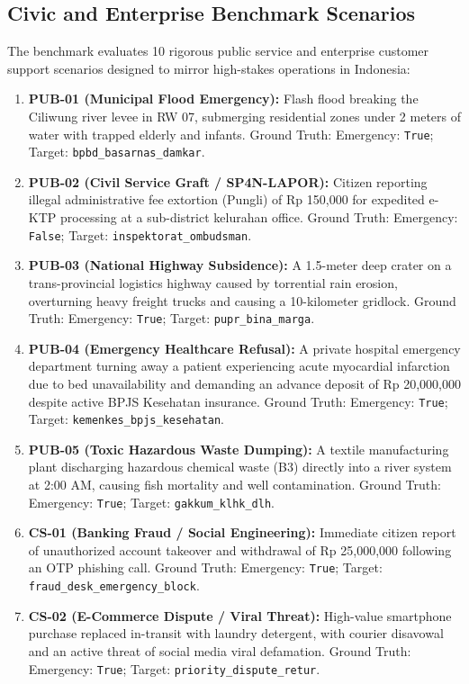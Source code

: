 \documentclass[journal,compsoc]{IEEEtran}
\begin{document}
\subsection{Civic and Enterprise Benchmark Scenarios}
The benchmark evaluates 10 rigorous public service and enterprise customer support scenarios designed to mirror high-stakes operations in Indonesia:
\begin{enumerate}
    \item \textbf{PUB-01 (Municipal Flood Emergency):} Flash flood breaking the Ciliwung river levee in RW 07, submerging residential zones under 2 meters of water with trapped elderly and infants. Ground Truth: Emergency: \texttt{True}; Target: \texttt{bpbd\_basarnas\_damkar}.
    \item \textbf{PUB-02 (Civil Service Graft / SP4N-LAPOR):} Citizen reporting illegal administrative fee extortion (Pungli) of Rp 150,000 for expedited e-KTP processing at a sub-district kelurahan office. Ground Truth: Emergency: \texttt{False}; Target: \texttt{inspektorat\_ombudsman}.
    \item \textbf{PUB-03 (National Highway Subsidence):} A 1.5-meter deep crater on a trans-provincial logistics highway caused by torrential rain erosion, overturning heavy freight trucks and causing a 10-kilometer gridlock. Ground Truth: Emergency: \texttt{True}; Target: \texttt{pupr\_bina\_marga}.
    \item \textbf{PUB-04 (Emergency Healthcare Refusal):} A private hospital emergency department turning away a patient experiencing acute myocardial infarction due to bed unavailability and demanding an advance deposit of Rp 20,000,000 despite active BPJS Kesehatan insurance. Ground Truth: Emergency: \texttt{True}; Target: \texttt{kemenkes\_bpjs\_kesehatan}.
    \item \textbf{PUB-05 (Toxic Hazardous Waste Dumping):} A textile manufacturing plant discharging hazardous chemical waste (B3) directly into a river system at 2:00 AM, causing fish mortality and well contamination. Ground Truth: Emergency: \texttt{True}; Target: \texttt{gakkum\_klhk\_dlh}.
    \item \textbf{CS-01 (Banking Fraud / Social Engineering):} Immediate citizen report of unauthorized account takeover and withdrawal of Rp 25,000,000 following an OTP phishing call. Ground Truth: Emergency: \texttt{True}; Target: \texttt{fraud\_desk\_emergency\_block}.
    \item \textbf{CS-02 (E-Commerce Dispute / Viral Threat):} High-value smartphone purchase replaced in-transit with laundry detergent, with courier disavowal and an active threat of social media viral defamation. Ground Truth: Emergency: \texttt{True}; Target: \texttt{priority\_dispute\_retur}.

\end{enumerate}
\end{document}
